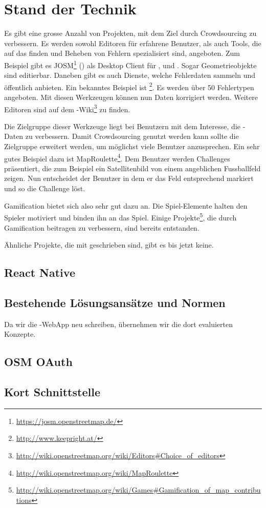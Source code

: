 \chapter{Stand der Technik}
\label{tb-stand-der-technik}
Es gibt eine grosse Anzahl von Projekten, mit dem Ziel  durch \gls{Crowdsourcing} zu verbessern.
Es werden sowohl Editoren für erfahrene Benutzer, als auch Tools, die auf das finden und Beheben von Fehlern spezialisiert sind, angeboten.
Zum Beispiel gibt es JOSM\footnote{\url{https://josm.openstreetmap.de/}} () als Desktop Client für ,  und .
Sogar Geometrieobjekte sind editierbar.
Daneben gibt es auch Dienste, welche Fehlerdaten sammeln und öffentlich anbieten.
Ein bekanntes Beispiel ist \footnote{\url{http://www.keepright.at/}}.
Es werden über 50 Fehlertypen angeboten.
Mit diesen Werkzeugen können nun Daten korrigiert werden.
Weitere Editoren sind auf dem -Wiki\footnote{\url{http://wiki.openstreetmap.org/wiki/Editors#Choice_of_editors}} zu finden.

Die Zielgruppe dieser Werkzeuge liegt bei Benutzern mit dem Interesse, die -Daten zu verbessern.
Damit \gls{Crowdsourcing} genutzt werden kann sollte die Zielgruppe erweitert werden, um möglichst viele Benutzer anzusprechen.
Ein sehr gutes Beispiel dazu ist MapRoulette\footnote{\url{http://wiki.openstreetmap.org/wiki/MapRoulette}}.
Dem Benutzer werden Challenges präsentiert, die zum Beispiel ein Satellitenbild von einem angeblichen Fussballfeld zeigen. 
Nun entscheidet der Benutzer in dem er das Feld entsprechend markiert und so die Challenge löst.

\gls{Gamification} bietet sich also sehr gut dazu an.
Die Spiel-Elemente halten den Spieler motiviert und binden ihn an das Spiel.
Einige Projekte\footnote{\url{http://wiki.openstreetmap.org/wiki/Games#Gamification_of_map_contributions}}, die durch \gls{Gamification} beitragen  zu verbessern, sind bereits entstanden.

Ähnliche Projekte, die mit  geschrieben sind, gibt es bis jetzt keine.


\section{React Native}


\section{Bestehende Lösungsansätze und Normen}
Da wir die \kort{}-\gls{WebApp} neu schreiben, übernehmen wir die dort evaluierten Konzepte.


\section{OSM OAuth}


\section{Kort Schnittstelle}

